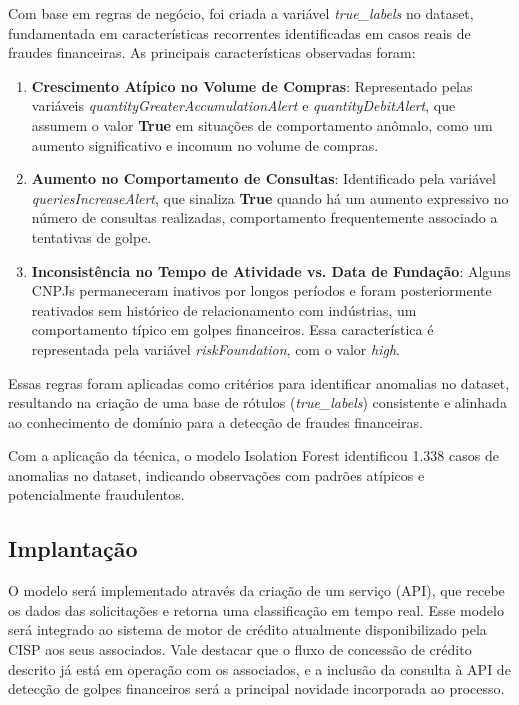 \documentclass[12pt,a4paper]{article}
\begin{document}
Com base em regras de neg\'ocio, foi criada a vari\'avel \textit{true\_labels} no dataset, fundamentada em caracter\'isticas recorrentes identificadas em casos reais de fraudes financeiras. As principais caracter\'isticas observadas foram:
\begin{enumerate}
    \item \textbf{Crescimento At\'ipico no Volume de Compras}: Representado pelas vari\'aveis \textit{quantityGreaterAccumulationAlert} e \textit{quantityDebitAlert}, que assumem o valor \textbf{True} em situa\c{c}\~{o}es de comportamento an\^omalo, como um aumento significativo e incomum no volume de compras.
    \item \textbf{Aumento no Comportamento de Consultas}: Identificado pela vari\'avel \textit{queriesIncreaseAlert}, que sinaliza \textbf{True} quando h\'a um aumento expressivo no n\'umero de consultas realizadas, comportamento frequentemente associado a tentativas de golpe.
    \item \textbf{Inconsist\^encia no Tempo de Atividade vs. Data de Funda\c{c}\~{a}o}: Alguns CNPJs permaneceram inativos por longos per\'iodos e foram posteriormente reativados sem hist\'orico de relacionamento com ind\'ustrias, um comportamento t\'ipico em golpes financeiros. Essa caracter\'istica \'e representada pela vari\'avel \textit{riskFoundation}, com o valor \textit{high}.
\end{enumerate}

Essas regras foram aplicadas como crit\'erios para identificar anomalias no dataset, resultando na cria\c{c}\~{a}o de uma base de r\'otulos (\textit{true\_labels}) consistente e alinhada ao conhecimento de dom\'inio para a detec\c{c}\~{a}o de fraudes financeiras.

Com a aplica\c{c}\~{a}o da t\'ecnica, o modelo Isolation Forest identificou 1.338 casos de anomalias no dataset, indicando observa\c{c}\~{o}es com padr\~{o}es at\'ipicos e potencialmente fraudulentos.

\subsection{Implanta\c{c}\~{a}o}

O modelo ser\'a implementado atrav\'es da cria\c{c}\~{a}o de um servi\c{c}o (API), que recebe os dados das solicita\c{c}\~{o}es e retorna uma classifica\c{c}\~{a}o em tempo real. Esse modelo ser\'a integrado ao sistema de motor de cr\'edito atualmente disponibilizado pela CISP aos seus associados. Vale destacar que o fluxo de concess\~{a}o de cr\'edito descrito j\'a est\'a em opera\c{c}\~{a}o com os associados, e a inclus\~{a}o da consulta \`a API de detec\c{c}\~{a}o de golpes financeiros ser\'a a principal novidade incorporada ao processo.
\end{document}
